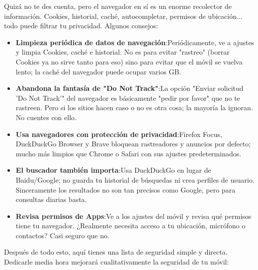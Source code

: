 
Quizá no te des cuenta, pero el navegador en sí es un enorme recolector de información. Cookies, historial, caché, autocompletar, permisos de ubicación... todo puede filtrar tu privacidad. Algunos consejos:

\begin{itemize}
  \item \textbf{Limpieza periódica de datos de navegación}:Periódicamente, ve a ajustes y limpia Cookies, caché e historial. No es para evitar "rastreo" (borrar Cookies ya no sirve tanto para eso) sino para evitar que el móvil se vuelva lento; la caché del navegador puede ocupar varios GB.
  \item \textbf{Abandona la fantasía de "Do Not Track"}:La opción "Enviar solicitud 'Do Not Track'" del navegador es básicamente "pedir por favor" que no te rastreen. Pero si los sitios hacen caso o no es otra cosa; la mayoría la ignoran. No cuentes con ello.
  \item \textbf{Usa navegadores con protección de privacidad}:Firefox Focus, DuckDuckGo Browser y Brave bloquean rastreadores y anuncios por defecto; mucho más limpios que Chrome o Safari con sus ajustes predeterminados.
  \item \textbf{El buscador también importa}:Usa DuckDuckGo en lugar de Baidu/Google; no guarda tu historial de búsquedas ni crea perfiles de usuario. Sinceramente los resultados no son tan precisos como Google, pero para consultas diarias basta.
  \item \textbf{Revisa permisos de Apps}:Ve a los ajustes del móvil y revisa qué permisos tiene tu navegador. ¿Realmente necesita acceso a tu ubicación, micrófono o contactos? Casi seguro que no.
\end{itemize}


Después de todo esto, aquí tienes una lista de seguridad simple y directa. Dedicarle media hora mejorará cualitativamente la seguridad de tu móvil:

